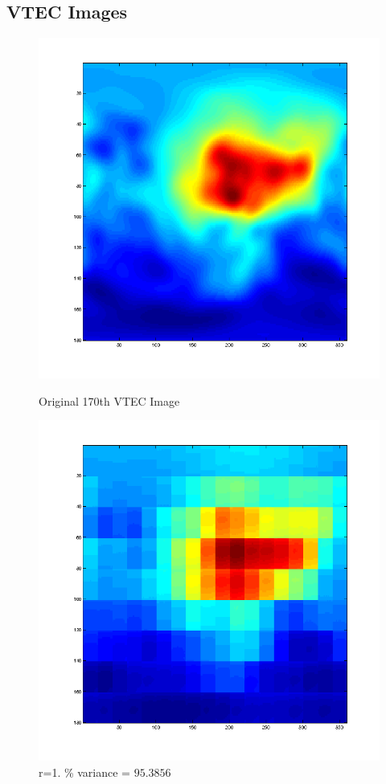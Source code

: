\documentclass[12pt,english]{article}
\begin{document}
\subsection{ VTEC Images }
\begin{figure}
\begin{minipage}{0.5\linewidth}
    \includegraphics[width=\linewidth]{pca-part-c-VTEC_Images-original.png}
    \caption{\footnotesize{Original 170th VTEC Image}}
\end{minipage}
\begin{minipage}{0.5\linewidth}
    \includegraphics[width=\linewidth]{pca-part-c-VTEC_Images-reconstructed-r=1.png}
    \caption{\footnotesize{r=1. \% variance = $95.3856$}}
\end{minipage}
\end{figure}
\end{document}
